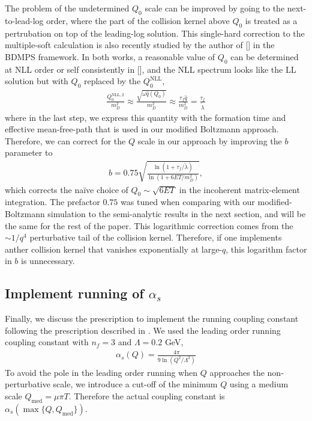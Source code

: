 \documentclass[aps, prc, reprint, amsmath, groupedaddress, nofootinbib]{revtex4-1}
\begin{document}
The problem of the undetermined $Q_0$ scale can be improved by going to the next-to-lead-log order, where the part of the collision kernel above $Q_0$ is treated as a pertrubation on top of the leading-log solution.
This single-hard correction to the multiple-soft calculation is also recently studied by the author of [] in the BDMPS framework.
In both works, a reasonable value of $Q_0$ can be determined at NLL order or self consistently in [], and the NLL spectrum looks like the LL solution but with $Q_0$ replaced by the $Q_{0}^{\textrm{NLL}}$,
\begin{eqnarray}
\frac{Q_{0}^{\textrm{NLL},2}}{m_D^2} \approx \frac{\sqrt{\omega \hat{q}(Q_0)}}{m_D^2} \approx \frac{\tau_f \hat{q}}{m_D^2} = \frac{\tau_f}{\tilde{\lambda}}
\end{eqnarray}
where in the last step, we express this quantity with the formation time and effective mean-free-path that is used in our modified Boltzmann approach.
Therefore, we can correct for the $Q$ scale in our approach by improving the $b$ parameter to 
\begin{eqnarray}
b = 0.75\sqrt{\frac{\ln\left(1+\tau_f/\tilde{\lambda}\right)}{\ln\left(1+6ET/m_D^2\right)}},
\end{eqnarray}
which corrects the na\"ive choice of $Q_0 \sim \sqrt{6ET}$ in the incoherent matrix-element integration.
The prefactor $0.75$ was tuned when comparing with our modified-Boltzmann simulation to the semi-analytic results in the next section, and will be the same for the rest of the paper.
This logarithmic correction comes from the $\sim 1/q^4$ perturbative tail of the collision kernel.
Therefore, if one implements anther collision kernel that vanishes exponentially at large-$q$, this logarithm factor in $b$ is unnecessary. 

\subsection{Implement running of $\alpha_s$}
Finally, we discuss the prescription to implement the running coupling constant following the prescription described in \cite{Arnold:2008zu}.
We used the leading order running coupling constant with $n_f = 3$ and $\Lambda = 0.2$ GeV, 
\begin{eqnarray}
\alpha_s(Q) = \frac{4\pi}{9\ln\left(Q^2/\Lambda^2\right)}
\end{eqnarray}
To avoid the pole in the leading order running when $Q$ approaches the non-perturbative scale, we introduce a cut-off of the minimum $Q$ using a medium scale $Q_{\textrm{med}} = \mu\pi T$. 
Therefore the actual coupling constant is $\alpha_s(\max\{Q, Q_{\textrm{med}}\})$.
\end{document}
